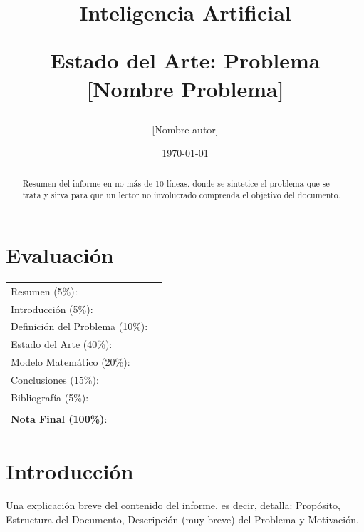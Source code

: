 \documentclass[letter, 10pt]{article}
\begin{document}
\title{Inteligencia Artificial \\ \begin{Large}Estado del Arte: Problema [Nombre Problema]\end{Large}}
\author{[Nombre autor]}
\date{\today}
\maketitle


\section*{Evaluaci\'on}

\begin{tabular}{ll}
Resumen (5\%): & \underline{\hspace{2cm}} \\
Introducci\'on (5\%):  & \underline{\hspace{2cm}} \\
Definici\'on del Problema (10\%):  & \underline{\hspace{2cm}} \\
Estado del Arte (40\%):  & \underline{\hspace{2cm}} \\
Modelo Matem\'atico (20\%): &  \underline{\hspace{2cm}}\\
Conclusiones (15\%): &  \underline{\hspace{2cm}}\\
Bibliograf\'ia (5\%): & \underline{\hspace{2cm}}\\
 &  \\
\textbf{Nota Final (100\%)}:   & \underline{\hspace{2cm}}
\end{tabular}
\vspace{2cm}


\begin{abstract}
Resumen del informe en no m\'as de 10 l\'ineas, donde se sintetice el problema que se trata y sirva para que un lector no involucrado comprenda el objetivo del documento.
\end{abstract}

\section{Introducci\'on}
Una explicaci\'on breve del contenido del informe, es decir, detalla: Prop\'osito, Estructura del Documento, Descripci\'on (muy breve) del Problema y Motivaci\'on.
\end{document}
